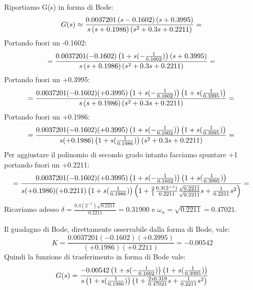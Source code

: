 Riportiamo G(s) in forma di Bode: \\
\begin{displaymath}
G(s)\approx\frac{0.0037201\left(s-0.1602\right)\left(s+0.3995\right)}{s\left(s+0.1986\right)\left(s^{2}+0.3s+0.2211\right)}= \\
\end{displaymath}
Portando fuori un -0.1602:
\begin{displaymath}
=\frac{0.0037201(-0.1602)\left(1+s(-\frac{1}{0.1602})\right)\left(s+0.3995\right)}{s\left(s+0.1986\right)\left(s^{2}+0.3s+0.2211\right)}= \\
\end{displaymath}
Portando fuori un +0.3995:
\begin{displaymath}
=\frac{0.0037201(-0.1602)(+0.3995)\left(1+s(-\frac{1}{0.1602})\right)\left(1+s(\frac{1}{0.3995})\right)}{s\left(s+0.1986\right)\left(s^{2}+0.3s+0.2211\right)}= \\
\end{displaymath}
Portando fuori un +0.1986:
\begin{displaymath}
=\frac{0.0037201(-0.1602)(+0.3995)\left(1+s(-\frac{1}{0.1602})\right)\left(1+s(\frac{1}{0.3995})\right)}{s(+0.1986)\left(1+s(\frac{1}{0.1986})\right)\left(s^{2}+0.3s+0.2211\right)}= \\
\end{displaymath}
Per aggiustare il polinomio di secondo grado intanto facciamo spuntare +1 portando fuori un +0.2211:
\begin{displaymath}
=\frac{0.0037201(-0.1602)(+0.3995)\left(1+s(-\frac{1}{0.1602})\right)\left(1+s(\frac{1}{0.3995})\right)}{s(+0.1986)(+0.2211)\left(1+s(\frac{1}{0.1986})\right)\left(1+\frac{2}{1}\frac{0.3(2^{-1})}{0.2211}\frac{\sqrt{0.2211}}{\sqrt{0.2211}}s+\frac{1}{0.2211}s^2\right)}= \\
\end{displaymath}
Ricaviamo adesso $\delta=\frac{0.3(2^{-1}){\sqrt{0.2211}}}{0.2211}=0.31900$ e $\omega_n={\sqrt{0.2211}}=0.47021$.
\\ \\
Il guadagno di Bode, direttamente osservabile dalla forma di Bode, vale: \\
$$K=\frac{0.0037201(-0.1602)(+0.3995)}{(+0.1986)(+0.2211)}=-0.00542$$
Quindi la funzione di trasferimento in forma di Bode vale:
\begin{displaymath}
G(s)=\frac{-0.00542\left(1+s(-\frac{1}{0.1602})\right)\left(1+s(\frac{1}{0.3995})\right)}{s\left(1+s(\frac{1}{0.1986})\right)\left(1+\frac{2*0.319}{0.47021}s+\frac{1}{0.2211}s^2\right)}\\
\end{displaymath}
